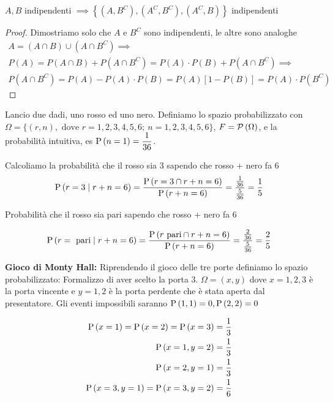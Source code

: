 \begin{exmp}
	$ A, B $ indipendenti $ \implies \left\{(A, B^C), (A^C, B^C), (A^C, B) \right\}$ indipendenti
	
	\begin{proof} Dimostriamo solo che $ A $ e $ B^C $ sono indipendenti, le altre sono analoghe
		\begin{equation*}
			\begin{aligned}
				A = (A \cap B) \cup (A \cap B^C)\implies  \\
				P(A) = P(A \cap B) + P(A \cap B^C) = P(A) \cdot P(B) + P(A \cap B^C) \implies\\
				P(A \cap B^C) = P(A) - P(A) \cdot P(B) =
				P(A)\left[1 - P(B)\right] = P(A) \cdot P(B^C)
			\end{aligned}
		\end{equation*}

	\end{proof}
\end{exmp}


\begin{exrc}
	Lancio due dadi, uno rosso ed uno nero. Definiamo lo spazio probabilizzato con
	$ \Omega = \{(r, n), \text{ dove } r = 1,2,3,4,5,6;\  n = 1,2,3,4,5,6 \}$,
	$ F = \mathcal{P}\left(\Omega\right)$, e la probabilit\`a intuitiva, es $ \text{P}\left(n=1\right) = \dfrac{1}{36} $.

	Calcoliamo la probabilit\`a che il rosso sia 3 sapendo che rosso + nero fa 6
	\begin{equation*}
	\text{P}\left(r=3  \mid  r+n = 6\right) = \dfrac{\text{P}\left(r=3 \cap r + n = 6\right)}{\text{P}\left(r+n=6\right)} = \frac{\frac{1}{36}}{\frac{5}{36}} = \frac{1}{5}
	\end{equation*}
	
	Probabilit\`a che il rosso sia pari sapendo che rosso + nero fa 6

	\begin{equation*}
	\text{P}\left(r = \text{ pari}  \mid  r+n = 6\right) = \dfrac{\text{P}\left(r \text{ pari} \cap r+n = 6\right)}{\text{P}\left(r+n = 6\right)} = \frac{\frac{2}{36}}{\frac{5}{36}} = \dfrac{2}{5}
	\end{equation*}
\end{exrc}


\begin{exrc}
	\textbf{Gioco di Monty Hall:}
	Riprendendo il gioco delle tre porte definiamo lo spazio probabilizzato: Formalizzo di aver scelto la porta 3. $ \Omega = (x,y) $ dove $ x = 1,2,3 $ \`e la porta vincente e $ y = 1,2 $ \`e la porta perdente che \`e stata aperta dal presentatore. Gli eventi impossibili saranno $ \text{P}\left(1,1\right) = 0, \text{P}\left(2,2\right) = 0 $
	
	\begin{equation*}
	\begin{aligned}
	\text{P}\left(x=1\right) = \text{P}\left(x=2\right) = \text{P}\left(x=3\right) = \dfrac{1}{3} \\
	\text{P}\left(x=1,y=2\right) = \dfrac{1}{3} \\
	\text{P}\left(x=2,y=1\right) = \dfrac{1}{3} \\
	\text{P}\left(x=3,y=1\right) = \text{P}\left(x=3,y=2\right) = \dfrac{1}{6} 
	\end{aligned}
	\end{equation*}
\end{exrc}





